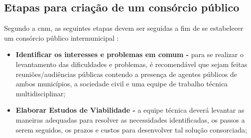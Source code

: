 \subsection{Etapas para criação de um consórcio público}

Segundo a \gls{cnm}, as seguintes etapas devem ser seguidas a fim de se estabelecer um consórcio público intermunicipal \cite{consorcio_publico}: 

\begin{itemize}
	\item \textbf{Identificar os interesses e problemas em comum -} para se realizar o levantamento das dificuldades e problemas, é recomendável que sejam feitas reuniões/audiências públicas contendo a presença de agentes públicos de ambos municípios, a sociedade civil e uma equipe de trabalho técnica multidisciplinar;   
	
	\item \textbf{Elaborar Estudos de Viabilidade -} a equipe técnica deverá levantar as maneiras adequadas para resolver as necessidades identificadas, os passos a serem seguidos, os prazos e custos para desenvolver tal solução consorciada;
	

\end{itemize}
